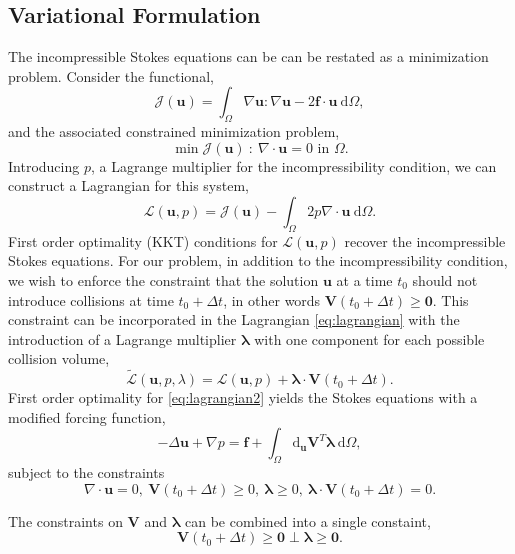 \documentclass[preprint, 10pt]{elsarticle}
\begin{document}
\subsection{Variational Formulation}

The incompressible Stokes equations can be can be restated as a minimization problem. Consider the functional,
\[ \mathcal{J}(\mathbf{u}) = \int_{\Omega} \nabla\mathbf{u}:\nabla\mathbf{u} - 2\mathbf{f}\cdot\mathbf{u} ~\text{d}\Omega,\]
and the associated constrained minimization problem,
\[ \min \mathcal{J}(\mathbf{u}) ~:~ \nabla\cdot\mathbf{u} = 0 \text{ in }\Omega.\]
Introducing $p$, a Lagrange multiplier for the incompressibility condition, we can construct a Lagrangian for this system,
\begin{equation}\label{eq:lagrangian} \mathcal{L}(\mathbf{u},p) = \mathcal{J}(\mathbf{u}) - \int_{\Omega} 2p\nabla\cdot\mathbf{u}~\text{d}\Omega.\end{equation}
First order optimality (KKT) conditions for $\mathcal{L}(\mathbf{u},p)$ recover the incompressible Stokes equations. For our problem, in addition to the incompressibility condition, we wish to enforce the constraint that the solution $\mathbf{u}$ at a time $t_0$ should not introduce collisions at time $t_0+\Delta t$, in other words $\mathbf{V}(t_0 + \Delta t) \geq \mathbf{0}$.
This constraint can be incorporated in the Lagrangian \eqref{eq:lagrangian} with the introduction of a Lagrange multiplier $\pmb{\lambda}$ with one component for each possible collision volume,
\begin{equation}\label{eq:lagrangian2} \tilde{\mathcal{L}}(\mathbf{u},p,\lambda) = \mathcal{L}(\mathbf{u},p) + \pmb{\lambda} \cdot \mathbf{V}(t_0+\Delta t).\end{equation}
First order optimality for \eqref{eq:lagrangian2} yields the Stokes equations with a modified forcing function,
\begin{equation}\label{eq:stokes_mod}-\Delta \mathbf{u} + \nabla p = \mathbf{f} + \int_{\Omega} \text{d}_{\mathbf{u}} \mathbf{V}^T\pmb{\lambda} ~\text{d}\Omega,\end{equation}
subject to the constraints
\[ \nabla\cdot\mathbf{u}  =0, ~\mathbf{V}(t_0 + \Delta t) \geq 0,~\pmb{\lambda} \geq 0, ~ \pmb{\lambda}\cdot\mathbf{V}(t_0+\Delta t) = 0.	\]

The constraints on $\mathbf{V}$ and $\pmb{\lambda}$ can be combined into a single constaint,
\begin{equation}\label{eq:ncp_constraint} \mathbf{V}(t_0 + \Delta t)\geq \mathbf{0} \perp \pmb{\lambda}\geq \mathbf{0}.\end{equation}
\end{document}
